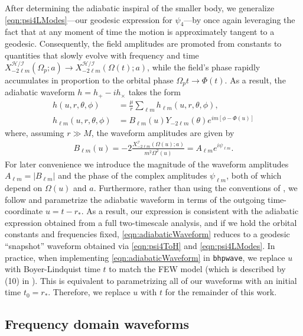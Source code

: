 \documentclass[%
 reprint,
 nofootinbib,
 amsmath,amssymb,
 aps,
 prd,
]{revtex4-2}
\begin{document}
After determining the adiabatic inspiral of the smaller body, we generalize \eqref{eqn:psi4LModes}---our geodesic expression for $\psi_4$---by once again leveraging the fact that at any moment of time the motion is approximately tangent to a geodesic. Consequently, the field amplitudes are promoted from constants to quantities that slowly evolve with frequency and time $X^\mathcal{H/I}_{-2\ell m}(\Omega_p; a) \rightarrow X^\mathcal{H/I}_{-2\ell m}(\Omega(t); a)$, while the field's phase rapidly accumulates in proportion to the orbital phase $\Omega_p t \rightarrow \Phi(t)$. As a result, the adiabatic waveform $h = h_+ - i h_\times$ takes the form
\begin{subequations} \label{eqn:adiabaticWaveform}
\begin{align} 
    h(u,r,\theta,\phi) &= \frac{\mu}{r}\sum_{\ell m} h_{\ell m}(u,r,\theta,\phi),
    \\
    h_{\ell m}(u,r,\theta,\phi) & = B_{\ell m}(u) Y_{-2\ell m}(\theta) e^{im[\phi - \Phi(u)]}  
\end{align}
\end{subequations}
where, assuming $r \gg M$, the waveform amplitudes are given by
\begin{align} \label{eqn:amplitude}
    B_{\ell m}(u) = -2\frac{X_{-2\ell m}^\mathcal{I}( \Omega(u);a)}{m^2\Omega^2(u)} = A_{\ell m} e^{i \psi_{\ell m}}.
\end{align}
For later convenience we introduce the magnitude of the waveform amplitudes $A_{\ell m} = |B_{\ell m}|$ and the phase of the complex amplitudes $\psi_{\ell m}$, both of which depend on $\Omega(u)$ and $a$. Furthermore, rather than using the conventions of \cite{KatzETC21,HughETC21}, we follow \cite{PounWard20} and parametrize the adiabatic waveform in terms of the outgoing time-coordinate $u=t-r_*$. As a result, our expression is consistent with the adiabatic expression obtained from a full two-timescale analysis, and if we hold the orbital constants and frequencies fixed, \eqref{eqn:adiabaticWaveform} reduces to a geodesic ``snapshot'' waveform obtained via \eqref{eqn:psi4ToH} and \eqref{eqn:psi4LModes}. In practice, when implementing \eqref{eqn:adiabaticWaveform} in \texttt{bhpwave}, we replace $u$ with Boyer-Lindquist time $t$ to match the FEW model (which is described by (10) in \cite{KatzETC21}). This is equivalent to parametrizing all of our waveforms with an initial time $t_0 = r_*$. Therefore, we replace $u$ with $t$ for the remainder of this work.

\subsection{Frequency domain waveforms}
\end{document}
